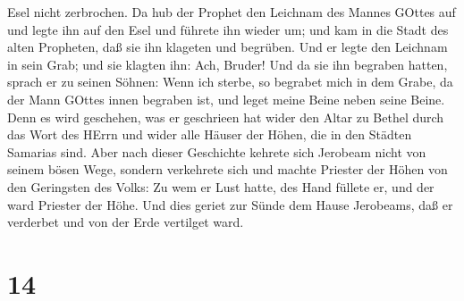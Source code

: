 Esel nicht zerbrochen.  Da hub der Prophet den Leichnam des
Mannes GOttes auf und legte ihn auf den Esel und führete ihn wieder um;
und kam in die Stadt des alten Propheten, daß sie ihn klageten und
begrüben.  Und er legte den Leichnam in sein Grab; und sie
klagten ihn: Ach, Bruder!  Und da sie ihn begraben hatten,
sprach er zu seinen Söhnen: Wenn ich sterbe, so begrabet mich in dem
Grabe, da der Mann GOttes innen begraben ist, und leget meine Beine
neben seine Beine.  Denn es wird geschehen, was er
geschrieen hat wider den Altar zu Bethel durch das Wort des HErrn und
wider alle Häuser der Höhen, die in den Städten Samarias sind.
 Aber nach dieser Geschichte kehrete sich Jerobeam nicht
von seinem bösen Wege, sondern verkehrete sich und machte Priester der
Höhen von den Geringsten des Volks: Zu wem er Lust hatte, des Hand
füllete er, und der ward Priester der Höhe.  Und dies
geriet zur Sünde dem Hause Jerobeams, daß er verderbet und von der Erde
vertilget ward.

\hypertarget{section-13}{%
\section{14}\label{section-13}}

